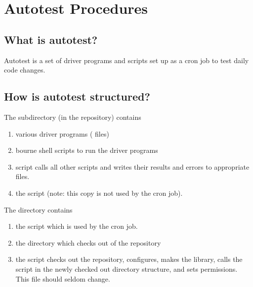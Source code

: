 \chapter{Autotest Procedures}
\label{Autotest Procedures}

\section{What is autotest?}
\label{What is autotest?}

Autotest is a set of driver programs and scripts set up as a cron job to
test daily code changes.

\section{How is autotest structured?}
\label{How is autotest structured?}

The  subdirectory (in the repository) contains
\begin{enumerate}
\item various driver programs ( files)
\item bourne shell scripts to run the driver programs
\item {} script calls all other scripts and writes their
results and errors to appropriate  files.
\item the  script (note: this copy is not used by the cron job).
\end{enumerate}

The  directory contains
\begin{enumerate}
\item the  script which is used by the cron job.
\item the  directory which  checks
out of the repository
\item the  script checks out the repository, configures,
makes the library, calls the  script in the newly
checked out directory structure, and sets permissions.
This file should seldom change.
\end{enumerate}

